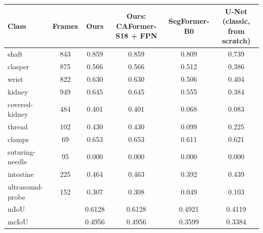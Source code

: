 \begin{tabular}{lccccc}
\hline
Class & Frames & Ours & Ours: CAFormer-S18 + FPN & SegFormer-B0 & U-Net (classic, from scratch) \\
\hline
shaft & 843 & 0.859 & 0.859 & 0.809 & 0.739 \\
clasper & 875 & 0.566 & 0.566 & 0.512 & 0.386 \\
wrist & 822 & 0.630 & 0.630 & 0.506 & 0.404 \\
kidney & 949 & 0.645 & 0.645 & 0.555 & 0.384 \\
covered-kidney & 484 & 0.401 & 0.401 & 0.068 & 0.083 \\
thread & 102 & 0.430 & 0.430 & 0.099 & 0.225 \\
clamps & 69 & 0.653 & 0.653 & 0.611 & 0.621 \\
suturing-needle & 95 & 0.000 & 0.000 & 0.000 & 0.000 \\
intestine & 225 & 0.464 & 0.463 & 0.392 & 0.439 \\
ultrasound-probe & 152 & 0.307 & 0.308 & 0.049 & 0.103 \\
mIoU &  & 0.6128 & 0.6128 & 0.4921 & 0.4119 \\
mcIoU &  & 0.4956 & 0.4956 & 0.3599 & 0.3384 \\
\hline
\end{tabular}

